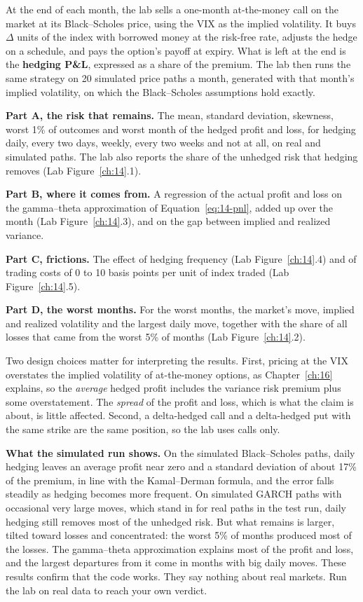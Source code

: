 At the end of each month, the lab sells a one-month at-the-money call on the market at its Black--Scholes price, using the VIX as the implied volatility. It buys $\Delta$ units of the index with borrowed money at the risk-free rate, adjusts the hedge on a schedule, and pays the option's payoff at expiry. What is left at the end is the \textbf{hedging P\&L}, expressed as a share of the premium. The lab then runs the same strategy on 20 simulated price paths a month, generated with that month's implied volatility, on which the Black--Scholes assumptions hold exactly.

\textbf{Part A, the risk that remains.} The mean, standard deviation, skewness, worst 1\% of outcomes and worst month of the hedged profit and loss, for hedging daily, every two days, weekly, every two weeks and not at all, on real and simulated paths. The lab also reports the share of the unhedged risk that hedging removes (Lab Figure~\ref{ch:14}.1).

\textbf{Part B, where it comes from.} A regression of the actual profit and loss on the gamma--theta approximation of Equation~\eqref{eq:14-pnl}, added up over the month (Lab Figure~\ref{ch:14}.3), and on the gap between implied and realized variance.

\textbf{Part C, frictions.} The effect of hedging frequency (Lab Figure~\ref{ch:14}.4) and of trading costs of 0 to 10 basis points per unit of index traded (Lab Figure~\ref{ch:14}.5).

\textbf{Part D, the worst months.} For the worst months, the market's move, implied and realized volatility and the largest daily move, together with the share of all losses that came from the worst 5\% of months (Lab Figure~\ref{ch:14}.2).

Two design choices matter for interpreting the results. First, pricing at the VIX overstates the implied volatility of at-the-money options, as Chapter~\ref{ch:16} explains, so the \emph{average} hedged profit includes the variance risk premium plus some overstatement. The \emph{spread} of the profit and loss, which is what the claim is about, is little affected. Second, a delta-hedged call and a delta-hedged put with the same strike are the same position, so the lab uses calls only.

\textbf{What the simulated run shows.} On the simulated Black--Scholes paths, daily hedging leaves an average profit near zero and a standard deviation of about 17\% of the premium, in line with the Kamal--Derman formula, and the error falls steadily as hedging becomes more frequent. On simulated GARCH paths with occasional very large moves, which stand in for real paths in the test run, daily hedging still removes most of the unhedged risk. But what remains is larger, tilted toward losses and concentrated: the worst 5\% of months produced most of the losses. The gamma--theta approximation explains most of the profit and loss, and the largest departures from it come in months with big daily moves. These results confirm that the code works. They say nothing about real markets. Run the lab on real data to reach your own verdict.

